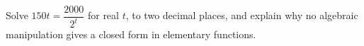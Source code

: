 Solve $150t=\dfrac{2000}{2^t}$ for real $t$, to two decimal places, and explain why no algebraic manipulation gives a closed form in elementary functions.
